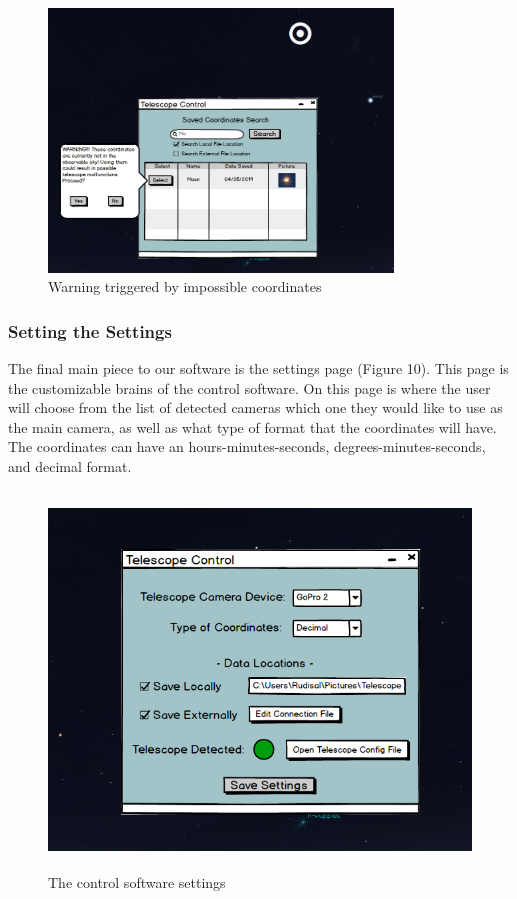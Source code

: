 \documentclass[12pt]{report}
\begin{document}
\begin{figure}[h]
	\centering
	\includegraphics[width=0.65\linewidth, height=7.0cm]{SearchwithWarning}
	\caption{Warning triggered by impossible coordinates}
\end{figure}

\newpage

\subsubsection*{Setting the Settings}

The final main piece to our software is the settings page (Figure 10). This page is the customizable brains of the control software. On this page is where the user will choose from the list of detected cameras which one they would like to use as the main camera, as well as what type of format that the coordinates will have. The coordinates can have an hours-minutes-seconds, degrees-minutes-seconds, and decimal format. 

\begin{figure}[h]
	\centering
	\includegraphics[width=0.75\linewidth, height=10.0cm]{Settings}
	\caption{The control software settings}
\end{figure}
\end{document}
